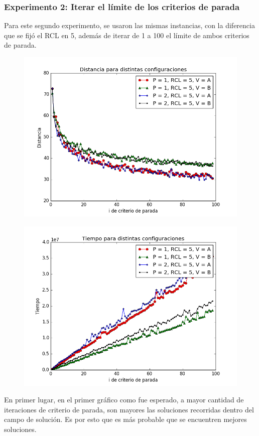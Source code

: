 \subsubsection{Experimento 2: Iterar el límite de los criterios de parada}

Para este segundo experimento, se usaron las mismas instancias, con la diferencia que se fijó el RCL en 5, además de iterar de 1 a 100 el límite de ambos criterios de parada.


\begin{figure}[H]
    \begin{center}
      \includegraphics[width=0.7\columnwidth]{imagenes/Exp2DistanciaEj4.png}
    \end{center}
\end{figure}

\begin{figure}[H]
    \begin{center}
      \includegraphics[width=0.7\columnwidth]{imagenes/Exp2TiempoEj4.png}
    \end{center}
\end{figure}


En primer lugar, en el primer gráfico como fue esperado, a mayor cantidad de iteraciones de criterio de parada, son mayores las soluciones recorridas dentro del campo de solución. Es por esto que es más probable que se encuentren mejores soluciones.

